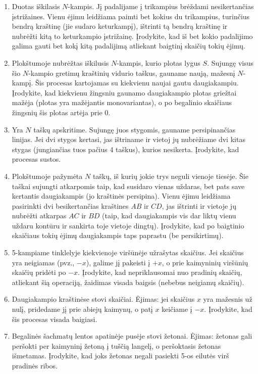 \documentclass[11pt,a4paper]{scrartcl}
\begin{document}
\begin{enumerate}
    \item Duotas iškilasis $N$-kampis. Jį padalijame į trikampius brėždami nesikertančias įstrižaines. Vienu ėjimu leidžiama paimti bet kokius du trikampius, turinčius bendrą kraštinę (jie sudaro keturkampį), ištrinti tą bendrą kraštinę ir nubrėžti kitą to keturkampio įstrižainę. Įrodykite, kad iš bet kokio padalijimo galima gauti bet kokį kitą padalijimą atliekant baigtinį skaičių tokių ėjimų.
    \item Plokštumoje nubrėžtas iškilusis $N$-kampis, kurio plotas lygus $S$. Sujungę visus šio $N$-kampio gretimų kraštinių vidurio taškus, gauname naują, mažesnį $N$-kampį. Šis procesas kartojamas su kiekvienu naujai gautu daugiakampiu. Įrodykite, kad kiekvienu žingsniu gaunamo daugiakampio plotas griežtai mažėja (plotas yra mažėjantis monovariantas), o po begalinio skaičiaus žingsnių šis plotas artėja prie $0$.
    \item Yra $N$ taškų apskritime. Sujungę juos stygomis, gauname persipinančias linijas. Jei dvi stygos kertasi, jas ištriname ir vietoj jų nubrėžiame dvi kitas stygas (jungiančias tuos pačius 4 taškus), kurios nesikerta. Įrodykite, kad procesas sustos.
    \item Plokštumoje pažymėta $N$ taškų, iš kurių jokie trys neguli vienoje tiesėje. Šie taškai sujungti atkarpomis taip, kad susidaro vienas uždaras, bet pats save kertantis daugiakampis (jo kraštinės persipina). Vienu ėjimu leidžiama pasirinkti dvi besikertančias kraštines $AB$ ir $CD$, jas ištrinti ir vietoje jų nubrėžti atkarpas $AC$ ir $BD$ (taip, kad daugiakampis vis dar liktų vienu uždaru kontūru ir sankirta toje vietoje dingtų). Įrodykite, kad po baigtinio skaičiaus tokių ėjimų daugiakampis taps paprastu (be persikirtimų).
    
    \item 5-kampiame tinklelyje kiekvienoje viršūnėje užrašytas skaičius. Jei skaičius yra neigiamas (pvz., $-x$), galime jį pakeisti į $+x$, o prie kaimyninių viršūnių skaičių pridėti po $-x$. Įrodykite, kad nepriklausomai nuo pradinių skaičių, atliekant šią operaciją, žaidimas visada baigsis (nebebus neigiamų skaičių).
    \item Daugiakampio kraštinėse stovi skaičiai. Ėjimas: jei skaičius $x$ yra mažesnis už nulį, pridedame jį prie abiejų kaimynų, o patį $x$ keičiame į $-x$. Įrodykite, kad šis procesas visada baigiasi.
    \item Begalinės šachmatų lentos apatinėje pusėje stovi žetonai. Ėjimas: žetonas gali peršokti per kaimyninį žetoną į tuščią langelį, o peršoktasis žetonas išmetamas. Įrodykite, kad joks žetonas negali pasiekti 5-os eilutės virš pradinės ribos.
\end{enumerate}
\end{document}
